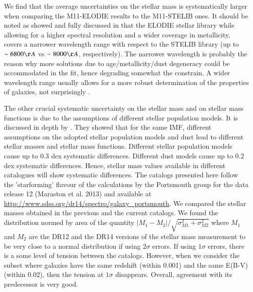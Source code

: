 \documentclass[onecolumn]{aa}
\begin{document}
We find that the average uncertainties on the stellar mass is systematically larger when comparing the M11-ELODIE results to the M11-STELIB ones. 
It should be noted as showed and fully discussed in \citet{Maraston_2011} that the ELODIE stellar library while allowing for a higher spectral resolution and a wider coverage in metallicity, covers a narrower wavelength range with respect to the STELIB library (up to $\sim 6800\AA$ vs $\sim 8000\AA$, respectively). 
The narrower wavelength is probably the reason why more solutions due to age/metallicity/dust degeneracy could be accommodated in the fit, hence degrading somewhat the constrain. 
A wider wavelength range usually allows for a more robust determination of the properties of galaxies, not surprisingly \citep[e.g.][]{2012MNRAS.422.3285P}. 
 
The other crucial systematic uncertainty on the stellar mass and on stellar mass functions is due to the assumptions of different stellar population models. 
It is discussed in depth by \citet{2016MNRAS.455.4122B}. 
They showed that for the same IMF, different assumptions on the adopted stellar population models and dust lead to different stellar masses and stellar mass functions. 
Different stellar population models cause up to 0.3 dex systematic differences. 
Different dust models cause up to 0.2 dex systematic differences.
Hence, stellar mass values available in different catalogues will show systematic differences. 
The catalogs presented here follow the 'starforming' flavour of the calculations by the Portsmouth group for the data release 12 (Maraston et al. 2013) and available at \url{http://www.sdss.org/dr14/spectro/galaxy_portsmouth}. 
We compared the stellar masses obtained in the previous and the current catalogs. 
We found the distribution normed by area of the quantity $|M_1-M_2|/\sqrt{\sigma^2_{M1}+\sigma^2_{M2}}$ where $M_1$ and $M_2$ are the DR12 and the DR14 versions of the stellar mass measurement to be very close to a normal distribution if using $2\sigma$ errors. 
If using $1\sigma$ errors, there is a some level of tension between the catalogs.  
However, when we consider the subset where galaxies have the same redshift (within 0.001) and the same E(B-V) (within 0.02), then the tension at $1\sigma$ disappears. 
Overall, agreement with its predecessor is very good.
\end{document}
